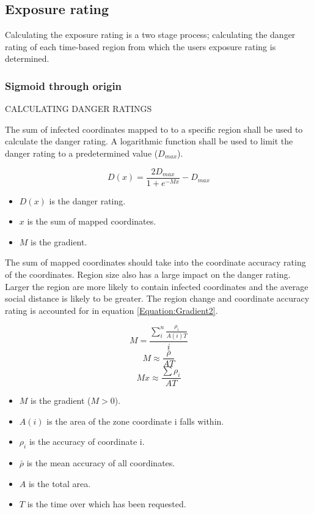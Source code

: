 \documentclass[a4paper,open right,12pt]{report}
\begin{document}
\subsection{Exposure rating}
Calculating the exposure rating is a two stage process; calculating the danger rating of each time-based region from which the users exposure rating is determined.
\subsubsection{Sigmoid through origin}
CALCULATING DANGER RATINGS

The sum of infected coordinates mapped to to a specific region shall be used to calculate the danger rating. A logarithmic function shall be used to limit the danger rating to a predetermined value ($D_{max}$).

\begin{equation} \label{Equation:DangerRating1}
    D(x)=\frac{2D_{max}}{1+e^{-Mx}}-D_{max}
\end{equation}
\begin{itemize}
    \item $D(x)$ is the danger rating.
    \item $x$ is the sum of mapped coordinates.
    \item $M$ is the gradient.
\end{itemize}

The sum of mapped coordinates should take into the coordinate accuracy rating of the coordinates. Region size also has a large impact on the danger rating. Larger the region are more likely to contain infected coordinates and the average social distance is likely to be greater. The region change and coordinate accuracy rating is accounted for in equation \ref{Equation:Gradient2}.

\begin{equation} \label{Equation:Gradient1}
    M=\frac{\sum_{i}^n\frac{\rho_{i}}{A(i)T}}{i}
\end{equation}
\begin{equation} \label{Equation:Gradient2}
    M\approx\frac{\bar{\rho}}{AT}
\end{equation}
\begin{equation} \label{Equation:Gradient3}
    Mx\approx\frac{\sum{\rho_{i}}}{AT}
\end{equation}

\begin{itemize}
    \item $M$ is the gradient ($M > 0$).
    \item $A(i)$ is the area of the zone coordinate i falls within.
    \item $\rho_{i}$ is the accuracy of coordinate i.
    \item $\bar{\rho}$ is the mean accuracy of all coordinates.
    \item $A$ is the total area.
    \item $T$ is the time over which has been requested.
\end{itemize}
\end{document}
